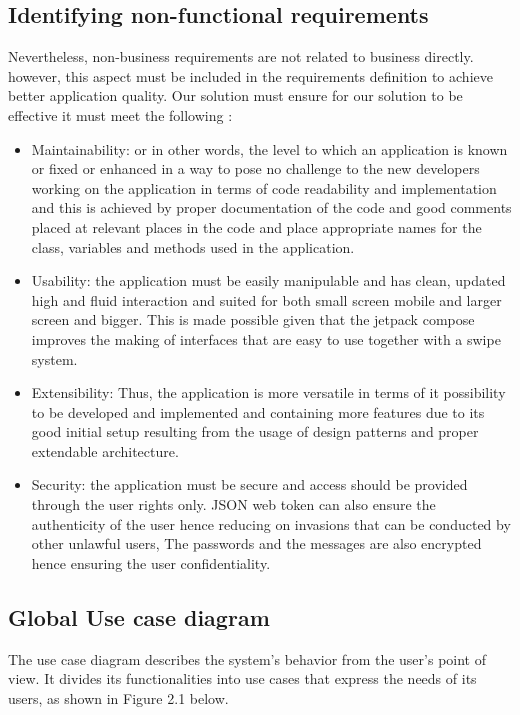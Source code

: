\subsection{Identifying non-functional requirements}
Nevertheless, non-business requirements are not related to business directly. however, this aspect must be included in the requirements definition to achieve better application quality. Our solution must ensure for our solution to be effective it must meet the following :
\begin{itemize}
    \item Maintainability: or in other words, the level to which an application is known or fixed or enhanced in a way to pose no challenge to the new developers working on the application in terms of code readability and implementation and this is achieved by proper documentation of the code and good comments placed at relevant places in the code and place appropriate names for the class, variables and methods used in the application.
    \item Usability: the application must be easily manipulable and has clean, updated high and fluid interaction and suited for both small screen mobile and larger screen and bigger. This is made possible given that the jetpack compose improves the making of interfaces that are easy to use together with a swipe system.
    \item Extensibility: Thus, the application is more versatile in terms of it possibility to be developed and implemented and containing more features due to its good initial setup resulting from the usage of design patterns and proper extendable architecture.
    \item Security: the application must be secure and access should be provided through the user rights only. JSON web token can also ensure the authenticity of the user hence reducing on invasions that can be conducted by other unlawful users, The passwords and the messages are also encrypted hence ensuring the user confidentiality.
\end{itemize}


\subsection{ Global Use case diagram}
The use case diagram describes the system's behavior from the user's point of view. It divides its functionalities into use cases that express the needs of its users, as shown in Figure 2.1 below.

